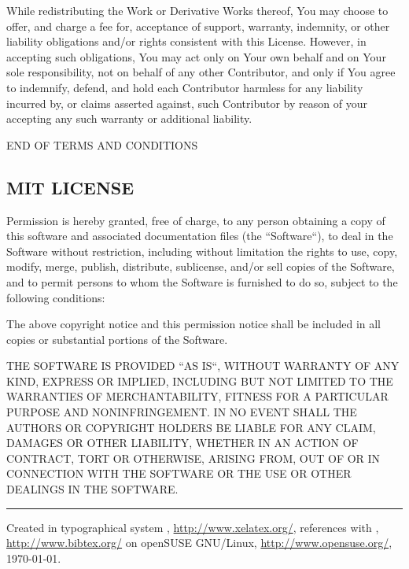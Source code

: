 \documentclass[a4paper, 11pt, twoside]{article}
\begin{document}
While redistributing the Work or Derivative Works thereof, You may choose to offer, and charge a fee for, acceptance of support, warranty, indemnity, or other liability obligations and/or rights consistent with this License. However, in accepting such obligations, You may act only on Your own behalf and on Your sole responsibility, not on behalf of any other Contributor, and only if You agree to indemnify, defend, and hold each Contributor harmless for any liability incurred by, or claims asserted against, such Contributor by reason of your accepting any such warranty or additional liability.

END OF TERMS AND CONDITIONS

\subsection{MIT LICENSE}

Permission is hereby granted, free of charge, to any person obtaining a copy of this software and associated documentation files (the “Software“), to deal in the Software without restriction, including without limitation the rights to use, copy, modify, merge, publish, distribute, sublicense, and/or sell copies of the Software, and to permit persons to whom the Software is furnished to do so, subject to the following conditions:

The above copyright notice and this permission notice shall be included in all copies or substantial portions of the Software.

THE SOFTWARE IS PROVIDED “AS IS“, WITHOUT WARRANTY OF ANY KIND, EXPRESS OR IMPLIED, INCLUDING BUT NOT LIMITED TO THE WARRANTIES OF MERCHANTABILITY, FITNESS FOR A PARTICULAR PURPOSE AND NONINFRINGEMENT. IN NO EVENT SHALL THE AUTHORS OR COPYRIGHT HOLDERS BE LIABLE FOR ANY CLAIM, DAMAGES OR OTHER LIABILITY, WHETHER IN AN ACTION OF CONTRACT, TORT OR OTHERWISE, ARISING FROM, OUT OF OR IN CONNECTION WITH THE SOFTWARE OR THE USE OR OTHER DEALINGS IN THE SOFTWARE.

\endgroup




\vfill
\hrule
\vfill
Created in typographical system \XeLaTeX, \href{http://www.xelatex.org/}{http://www.xelatex.org/}, references with \BibTeX, \href{http://www.bibtex.org/}{http://www.bibtex.org/} on openSUSE GNU/Linux, \href{http://www.opensuse.org/}{http://www.opensuse.org/}, \today.
\end{document}
